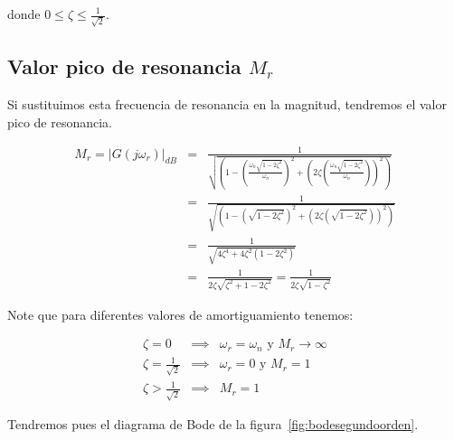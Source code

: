             donde $0 \le \zeta \le \frac{1}{\sqrt{2}}$.


        \subsection{Valor pico de resonancia $M_r$}

            Si sustituimos esta frecuencia de resonancia en la magnitud, tendremos el valor pico de resonancia.

            \begin{eqnarray*}
                M_r = \left| G(j \omega_r) \right|_{dB} & = & \frac{1}{\sqrt{\left( 1 - \left( \frac{\omega_n \sqrt{1 - 2 \zeta^2}}{\omega_n} \right)^2 + \left( 2 \zeta \left( \frac{\omega_n \sqrt{1 - 2 \zeta^2}}{\omega_n} \right) \right)^2 \right)}} \\
                & = & \frac{1}{\sqrt{\left( 1 - \left( \sqrt{1 - 2 \zeta^2} \right)^2 + \left( 2 \zeta \left( \sqrt{1 - 2 \zeta^2} \right) \right)^2 \right)}} \\
                & = & \frac{1}{\sqrt{4 \zeta^4 + 4 \zeta^2 \left( 1 - 2 \zeta^2 \right)}} \\
                & = & \frac{1}{2 \zeta \sqrt{\zeta^2 + 1 - 2 \zeta^2}} = \frac{1}{2 \zeta \sqrt{1 - \zeta^2}}
            \end{eqnarray*}

            Note que para diferentes valores de amortiguamiento tenemos:

            \begin{eqnarray*}
                \zeta = 0 & \implies & \omega_r = \omega_n \text{ y } M_r \to \infty \\
                \zeta = \frac{1}{\sqrt{2}} & \implies & \omega_r = 0 \text{ y } M_r = 1 \\
                \zeta > \frac{1}{\sqrt{2}} & \implies & M_r = 1
            \end{eqnarray*}

            Tendremos pues el diagrama de Bode de la figura~\ref{fig:bodesegundoorden}.


